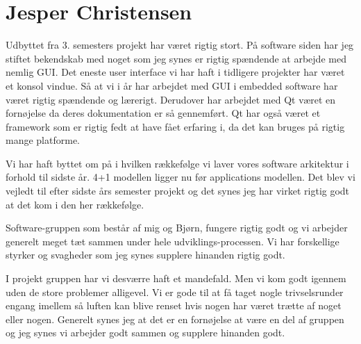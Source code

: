 \section{Jesper Christensen}

Udbyttet fra 3. semesters projekt har været rigtig stort. På software siden har jeg stiftet bekendskab med noget som jeg synes er rigtig spændende at arbejde med nemlig GUI. Det eneste user interface vi har haft i tidligere projekter har været et konsol vindue. Så at vi i år har arbejdet med GUI i embedded software har været rigtig spændende og lærerigt. Derudover har arbejdet med Qt været en fornøjelse da deres dokumentation er så gennemført. Qt har også været et framework som er rigtig fedt at have fået erfaring i, da det kan bruges på rigtig mange platforme.

Vi har haft byttet om på i hvilken rækkefølge vi laver vores software arkitektur i forhold til sidste år. 4+1 modellen ligger nu før applications modellen. Det blev vi vejledt til efter sidste års semester projekt og det synes jeg har virket rigtig godt at det kom i den her rækkefølge.

Software-gruppen som består af mig og Bjørn, fungere rigtig godt og vi arbejder generelt meget tæt sammen under hele udviklings-processen. Vi har forskellige styrker og svagheder som jeg synes supplere hinanden rigtig godt.

I projekt gruppen har vi desværre haft et mandefald. Men vi kom godt igennem uden de store problemer alligevel. Vi er gode til at få taget nogle trivselsrunder engang imellem så luften kan blive renset hvis nogen har været trætte af noget eller nogen. Generelt synes jeg at det er en fornøjelse at være en del af gruppen og jeg synes vi arbejder godt sammen og supplere hinanden godt.